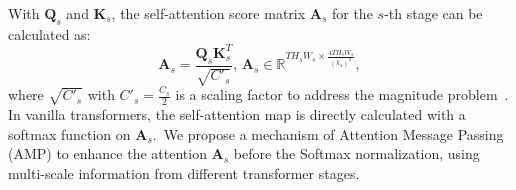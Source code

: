 \documentclass[runningheads]{llncs}
\begin{document}
With $\mathbf{Q}_s$ and $\mathbf{K}_s$, the self-attention score matrix $\mathbf{A}_s$ for the $s$-th stage can be calculated as:
\begin{equation} \label{equ:asco}
    \mathbf{A}_s = \frac{\mathbf{Q}_s \mathbf{K}^T_s}{\sqrt{C'_s}}, \, \mathbf{A}_s \in \mathbb{R}^{T H_s W_s \times \frac{4T H_s W_s}{(k_s)^2}},
\end{equation}
where $\sqrt{C'_s}$ with $C'_s=\frac{C_s}{2}$ is a scaling factor to address the magnitude problem~\cite{transformer}. In vanilla transformers, the self-attention map is directly calculated with a softmax function on $\mathbf{A}_s$.~We propose a mechanism of Attention Message Passing (AMP) to enhance the attention $\mathbf{A}_s$ before the Softmax normalization, using multi-scale information from different transformer stages.
\end{document}
